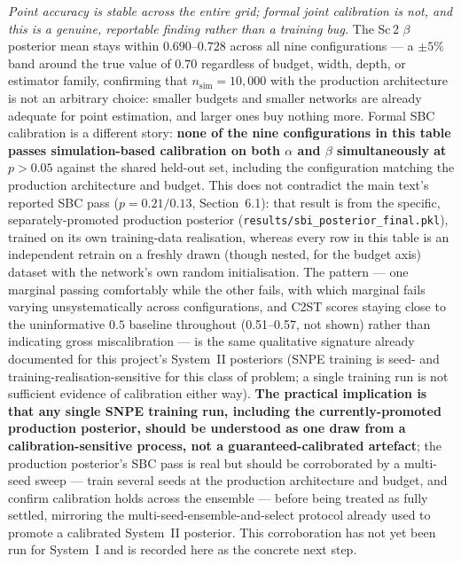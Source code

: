 \documentclass[aps,pre,twocolumn,superscriptaddress]{revtex4-2}
\begin{document}
\textit{Point accuracy is stable across the entire grid; formal joint calibration
is not, and this is a genuine, reportable finding rather than a training bug.} The
Sc\,2 $\beta$ posterior mean stays within $0.690$--$0.728$ across all nine
configurations --- a $\pm5\%$ band around the true value of $0.70$ regardless of
budget, width, depth, or estimator family, confirming that $n_\mathrm{sim}=10{,}000$
with the production architecture is not an arbitrary choice: smaller budgets and
smaller networks are already adequate for point estimation, and larger ones buy
nothing more. Formal SBC calibration is a different story: \textbf{none of the nine
configurations in this table passes simulation-based calibration on both $\alpha$
and $\beta$ simultaneously at $p>0.05$} against the shared held-out set, including
the configuration matching the production architecture and budget. This does not
contradict the main text's reported SBC pass ($p=0.21/0.13$, Section~6.1): that
result is from the specific, separately-promoted production posterior
(\texttt{results/sbi\_posterior\_final.pkl}), trained on its own training-data
realisation, whereas every row in this table is an independent retrain on a
freshly drawn (though nested, for the budget axis) dataset with the network's own
random initialisation. The pattern --- one marginal passing comfortably while the
other fails, with which marginal fails varying unsystematically across
configurations, and C2ST scores staying close to the uninformative $0.5$ baseline
throughout (0.51--0.57, not shown) rather than indicating gross miscalibration ---
is the same qualitative signature already documented for this project's System~II
posteriors (SNPE training is seed- and training-realisation-sensitive for this
class of problem; a single training run is not sufficient evidence of calibration
either way). \textbf{The practical implication is that any single SNPE training
run, including the currently-promoted production posterior, should be understood as
one draw from a calibration-sensitive process, not a guaranteed-calibrated
artefact}; the production posterior's SBC pass is real but should be corroborated
by a multi-seed sweep --- train several seeds at the production architecture and
budget, and confirm calibration holds across the ensemble --- before being treated
as fully settled, mirroring the multi-seed-ensemble-and-select protocol already used
to promote a calibrated System~II posterior. This corroboration has not yet been run
for System~I and is recorded here as the concrete next step.
\end{document}
